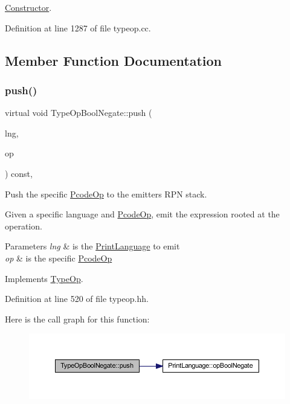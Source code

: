 \mbox{\hyperlink{class_constructor}{Constructor}}. 



Definition at line 1287 of file typeop.\+cc.



\subsection{Member Function Documentation}
\mbox{\label{class_type_op_bool_negate_a883c147c47b067415a00bfe50b4df182}} 
\subsubsection{\texorpdfstring{push()}{push()}}
{\footnotesize\ttfamily virtual void Type\+Op\+Bool\+Negate\+::push (\begin{DoxyParamCaption}\item[{\mbox{\hyperlink{class_print_language}{Print\+Language}} $\ast$}]{lng,  }\item[{const \mbox{\hyperlink{class_pcode_op}{Pcode\+Op}} $\ast$}]{op }\end{DoxyParamCaption}) const\hspace{0.3cm}{\ttfamily [inline]}, {\ttfamily [virtual]}}



Push the specific \mbox{\hyperlink{class_pcode_op}{Pcode\+Op}} to the emitter\textquotesingle{}s R\+PN stack. 

Given a specific language and \mbox{\hyperlink{class_pcode_op}{Pcode\+Op}}, emit the expression rooted at the operation. 
\begin{DoxyParams}{Parameters}
{\em lng} & is the \mbox{\hyperlink{class_print_language}{Print\+Language}} to emit \\
\hline
{\em op} & is the specific \mbox{\hyperlink{class_pcode_op}{Pcode\+Op}} \\
\hline
\end{DoxyParams}


Implements \mbox{\hyperlink{class_type_op_ac9c9544203ed74dabe6ac662b653b2af}{Type\+Op}}.



Definition at line 520 of file typeop.\+hh.

Here is the call graph for this function\+:
\nopagebreak
\begin{figure}[H]
\begin{center}
\leavevmode
\includegraphics[width=350pt]{class_type_op_bool_negate_a883c147c47b067415a00bfe50b4df182_cgraph}
\end{center}
\end{figure}


